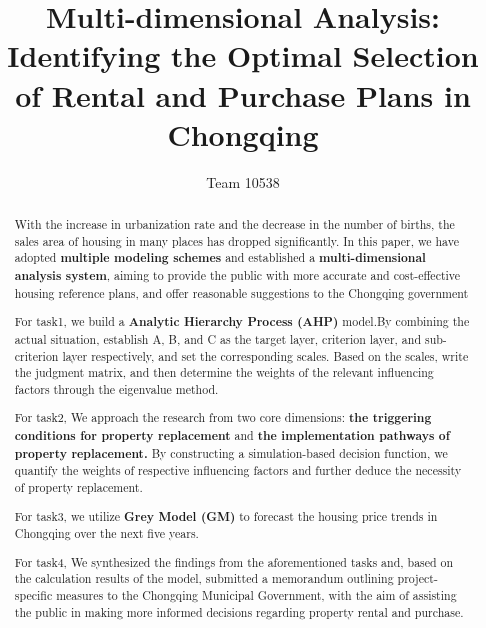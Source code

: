 \documentclass{mcmthesis}
\title{\textbf{Multi-dimensional Analysis: Identifying the Optimal Selection of Rental and Purchase Plans in Chongqing}}
\author{Team 10538} %
\begin{document}
\begin{abstract}
\begingroup
\setlength{\parskip}{8pt} %

With the increase in urbanization rate and the decrease in the number of births, the sales area of housing in many places has dropped significantly.
In this paper, we have adopted \textbf{multiple modeling schemes} and established a \textbf{multi-dimensional analysis system}, 
aiming to provide the public with more accurate and cost-effective housing reference plans, 
and offer reasonable suggestions to the Chongqing government

For task1, we build a \textbf{Analytic Hierarchy Process (AHP)} model.By combining the actual situation, 
establish A, B, and C as the target layer, criterion layer, and sub-criterion layer respectively, 
and set the corresponding scales. Based on the scales, write the judgment matrix,
and then determine the weights of the relevant influencing factors through the eigenvalue method.

For task2, We approach the research from two core dimensions: 
\textbf{the triggering conditions for property replacement} and \textbf{the implementation pathways of property replacement.}
By constructing a simulation-based decision function, 
we quantify the weights of respective influencing factors and further deduce the necessity of property replacement.

For task3, we utilize \textbf{Grey Model (GM)} to forecast the housing price trends in Chongqing over the next five years.

For task4, We synthesized the findings from the aforementioned tasks and, 
based on the calculation results of the model, 
submitted a memorandum outlining project-specific measures to the Chongqing Municipal Government, 
with the aim of assisting the public in making more informed decisions regarding property rental and purchase.

\endgroup
\end{abstract}
\end{document}
